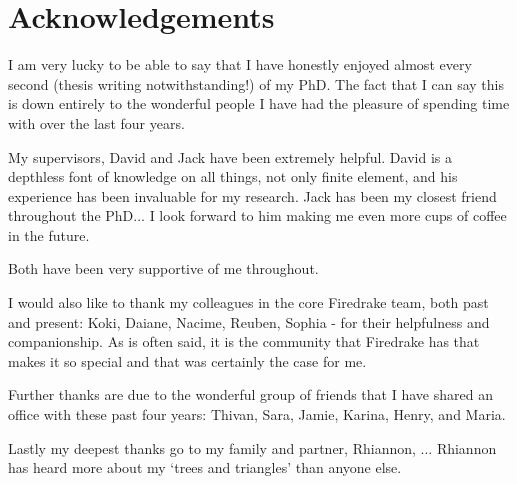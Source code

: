 \chapter*{Acknowledgements}

I am very lucky to be able to say that I have honestly enjoyed almost every second (thesis writing notwithstanding!) of my PhD.
The fact that I can say this is down entirely to the wonderful people I have had the pleasure of spending time with over the last four years.

My supervisors, David and Jack have been extremely helpful.
David is a depthless font of knowledge on all things, not only finite element, and his experience has been invaluable for my research.
Jack has been my closest friend throughout the PhD... I look forward to him making me even more cups of coffee in the future.

Both have been very supportive of me throughout.

I would also like to thank my colleagues in the core Firedrake team, both past and present: Koki, Daiane, Nacime, Reuben, Sophia - for their helpfulness and companionship.
As is often said, it is the community that Firedrake has that makes it so special and that was certainly the case for me.

Further thanks are due to the wonderful group of friends that I have shared an office with these past four years: Thivan, Sara, Jamie, Karina, Henry, and Maria.

Lastly my deepest thanks go to my family and partner, Rhiannon, ...
Rhiannon has heard more about my `trees and triangles' than anyone else.

\clearpage
